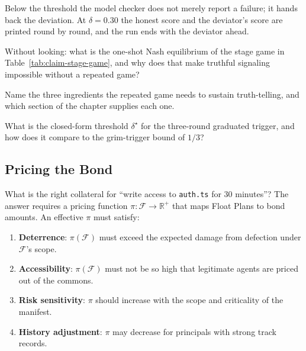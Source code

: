 \documentclass[11pt,a4paper]{article}
\theoremstyle{definition}
\theoremstyle{remark}
\begin{document}
Below the threshold the model checker does not merely report a failure; it hands back the
deviation. At $\delta=0.30$ the honest score and the deviator's score are printed round by
round, and the run ends with the deviator ahead.




\pdexercisepointer*{\ref{ex:bonded-threshold-hand}}{\ref{ex:bonded-sweep-crossover}}{\pageref{ex:bonded-threshold-hand}}

\begin{pdrecitation}
\item Without looking: what is the one-shot Nash equilibrium of the stage game in Table~\ref{tab:claim-stage-game}, and why does that make truthful signaling impossible without a repeated game?
\item Name the three ingredients the repeated game needs to sustain truth-telling, and which section of the chapter supplies each one.
\item What is the closed-form threshold $\delta^\star$ for the three-round graduated trigger, and how does it compare to the grim-trigger bound of $1/3$?
\end{pdrecitation}

\subsection{Pricing the Bond}\label{sec:pricing}

What is the right collateral for ``write access to \texttt{auth.ts} for 30 minutes''? The answer requires a pricing function $\pi: \mathcal{F} \rightarrow \mathbb{R}^{+}$ that maps Float Plans to bond amounts. An effective $\pi$ must satisfy:

\begin{enumerate}[nosep]
  \item \textbf{Deterrence}: $\pi(\mathcal{F})$ must exceed the expected damage from defection under $\mathcal{F}$'s scope.
  \item \textbf{Accessibility}: $\pi(\mathcal{F})$ must not be so high that legitimate agents are priced out of the commons.
  \item \textbf{Risk sensitivity}: $\pi$ should increase with the scope and criticality of the manifest.
  \item \textbf{History adjustment}: $\pi$ may decrease for principals with strong track records.
\end{enumerate}
\end{document}
